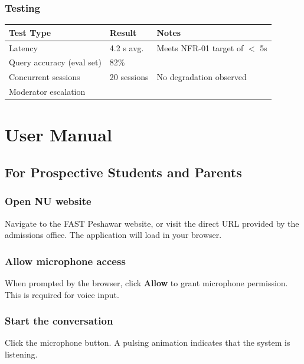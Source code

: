\documentclass[12pt,a4paper]{report}
\begin{document}
\subsubsection{Testing}

\begin{table}[H]
  \centering
  \begin{tabular}{p{5cm} p{3cm} p{5cm}}
    \toprule
    \textbf{Test Type}      & \textbf{Result} & \textbf{Notes} \\
    \midrule
    Latency      & 4.2 s avg.      & Meets NFR-01 target of $<$ 5s \\
    Query accuracy (eval set) & 82\%          & \\
    Concurrent sessions     & 20 sessions     & No degradation observed \\
    Moderator escalation    &    &  \\
    \bottomrule
  \end{tabular}
\end{table}


\newpage
\section{User Manual}

\subsection{For Prospective Students and Parents}

\subsubsection{Open NU website}
Navigate to the FAST Peshawar website, or visit the direct URL provided by the admissions office. The application will load in your browser.

\subsubsection{Allow microphone access}
When prompted by the browser, click \textbf{Allow} to grant microphone
permission. This is required for voice input.

\subsubsection{Start the conversation}
Click the microphone button. A pulsing animation indicates that the system is listening.
\end{document}
